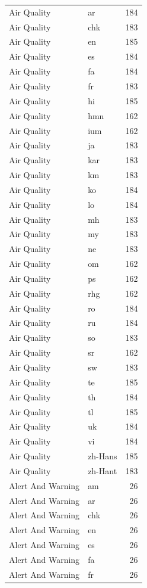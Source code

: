 \begin{longtable}{p{3cm} p{3cm} r}
Air Quality & ar & 184 \\
Air Quality & chk & 183 \\
Air Quality & en & 185 \\
Air Quality & es & 184 \\
Air Quality & fa & 184 \\
Air Quality & fr & 183 \\
Air Quality & hi & 185 \\
Air Quality & hmn & 162 \\
Air Quality & ium & 162 \\
Air Quality & ja & 183 \\
Air Quality & kar & 183 \\
Air Quality & km & 183 \\
Air Quality & ko & 184 \\
Air Quality & lo & 184 \\
Air Quality & mh & 183 \\
Air Quality & my & 183 \\
Air Quality & ne & 183 \\
Air Quality & om & 162 \\
Air Quality & ps & 162 \\
Air Quality & rhg & 162 \\
Air Quality & ro & 184 \\
Air Quality & ru & 184 \\
Air Quality & so & 183 \\
Air Quality & sr & 162 \\
Air Quality & sw & 183 \\
Air Quality & te & 185 \\
Air Quality & th & 184 \\
Air Quality & tl & 185 \\
Air Quality & uk & 184 \\
Air Quality & vi & 184 \\
Air Quality & zh-Hans & 185 \\
Air Quality & zh-Hant & 183 \\
Alert And Warning & am & 26 \\
Alert And Warning & ar & 26 \\
Alert And Warning & chk & 26 \\
Alert And Warning & en & 26 \\
Alert And Warning & es & 26 \\
Alert And Warning & fa & 26 \\
Alert And Warning & fr & 26 \\

\end{longtable}
